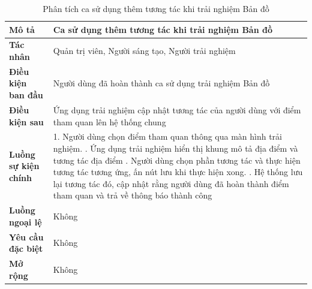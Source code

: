 \begin{table}
\centering
\caption{Phân tích ca sử dụng thêm tương tác khi trải nghiệm Bản đồ}
\begin{tabular}{|p{4cm}|p{10cm}|}
    \hline
\textbf{Mô tả} & Ca sử dụng thêm tương tác khi trải nghiệm Bản đồ \\ \hline
\textbf{Tác nhân} & Quản trị viên, Người sáng tạo, Người trải nghiệm \\ \hline
\textbf{Điều kiện ban đầu} & Người dùng đã hoàn thành ca sử dụng trải nghiệm Bản đồ \\ \hline
\textbf{Điều kiện sau} & Ứng dụng trải nghiệm cập nhật tương tác của người dùng với điểm tham quan lên hệ thống chung \\ \hline
\textbf{Luồng sự kiện chính} & 
1. Người dùng chọn điểm tham quan thông qua màn hình trải nghiệm. \newline
2. Ứng dụng trải nghiệm hiển thị khung mô tả địa điểm và tương tác địa điểm \newline
3. Người dùng chọn phần tương tác và thực hiện tương tác tương ứng, ấn nút lưu khi thực hiện xong. \newline
4. Hệ thống lưu lại tương tác đó, cập
nhật rằng người dùng đã hoàn
thành điểm tham quan và trả về
thông báo thành công \\ \hline
\textbf{Luồng ngoại lệ} & Không \\ \hline
\textbf{Yêu cầu đặc biệt} & Không \\ \hline
\textbf{Mở rộng} & Không \\ \hline
\end{tabular}
\end{table}
